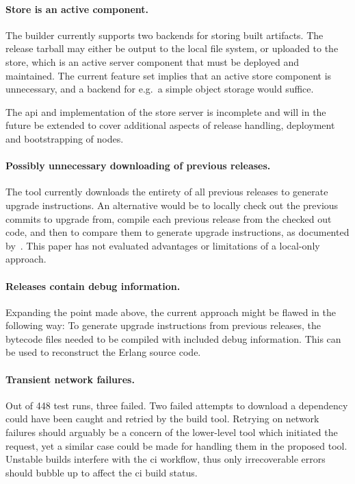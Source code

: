 \paragraph{Store is an active component.} The builder currently supports two backends for storing built artifacts. The release tarball may either be output to the local file system, or uploaded to the store, which is an active server component that must be deployed and maintained. The current feature set implies that an active store component is unnecessary, and a backend for e.g.~a simple object storage would suffice.

The \acrshort{api} and implementation of the store server is incomplete and will in the future be extended to cover additional aspects of release handling, deployment and bootstrapping of nodes.

\paragraph{Possibly unnecessary downloading of previous releases.} The tool currently downloads the entirety of all previous releases to generate upgrade instructions. An alternative would be to locally check out the previous commits to upgrade from, compile each previous release from the checked out code, and then to compare them to generate upgrade instructions, as documented by~\cite{rebar3appup}. This paper has not evaluated advantages or limitations of a local-only approach.

\paragraph{Releases contain debug information.} Expanding the point made above, the current approach might be flawed in the following way: To generate upgrade instructions from previous releases, the bytecode files needed to be compiled with included debug information. This can be used to reconstruct the Erlang source code.~\cite{doc:otp}

\paragraph{Transient network failures.} Out of 448 test runs, three failed. Two failed attempts to download a dependency could have been caught and retried by the build tool. Retrying on network failures should arguably be a concern of the lower-level tool which initiated the request, yet a similar case could be made for handling them in the proposed tool. Unstable builds interfere with the \acrshort{ci} workflow, thus only irrecoverable errors should bubble up to affect the \acrshort{ci} build status.

